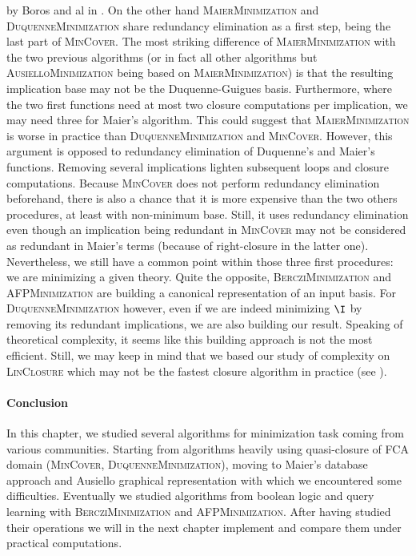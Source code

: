 by Boros and al in \cite{boros_strong_2017}. On the other hand \textsc{MaierMinimization} and \textsc{DuquenneMinimization} share redundancy elimination as a first step, being the last part of \textsc{MinCover}. The most striking difference of \textsc{MaierMinimization} with the two previous algorithms (or in fact all other algorithms but \textsc{AusielloMinimization} being based on \textsc{MaierMinimization}) is that the resulting implication base may not be the Duquenne-Guigues basis. Furthermore, where the two first functions need at most two closure computations per implication, we may need three for Maier's algorithm. This could suggest that \textsc{MaierMinimization} is worse in practice than \textsc{DuquenneMinimization} and \textsc{MinCover}. However, this argument is opposed to redundancy elimination of Duquenne's and Maier's functions. Removing several implications lighten subsequent loops and closure computations. Because \textsc{MinCover} does not perform redundancy elimination beforehand, there is also a chance that it is more expensive than the two others procedures, at least with non-minimum base. Still, it uses redundancy elimination even though an implication being redundant in \textsc{MinCover} may not be considered as redundant in Maier's terms (because of right-closure in the latter one). Nevertheless, we still have a common point within those three first procedures: we are minimizing a given theory. Quite the opposite, \textsc{BercziMinimization} and \textsc{AFPMinimization} are building a canonical representation of an input basis. For \textsc{DuquenneMinimization} however, even if we are indeed minimizing $\I$ by removing its redundant implications, we are also building our result. Speaking of theoretical complexity, it seems like this building approach is not the most efficient. Still, we may keep in mind that we based our study of complexity on \textsc{LinClosure} which may not be the fastest closure algorithm in practice (see \cite{bazhanov_optimizations_2014}). 


\paragraph{Conclusion} In this chapter, we studied several algorithms for 
minimization task coming from various communities. Starting from algorithms
heavily using quasi-closure of FCA domain (\textsc{MinCover}, \textsc{DuquenneMinimization}), moving to Maier's database approach and Ausiello graphical representation with which we encountered some difficulties. Eventually we studied algorithms from boolean logic and query learning with \textsc{BercziMinimization} and \textsc{AFPMinimization}. After having studied their operations we will in the next chapter implement and compare them under practical computations.



